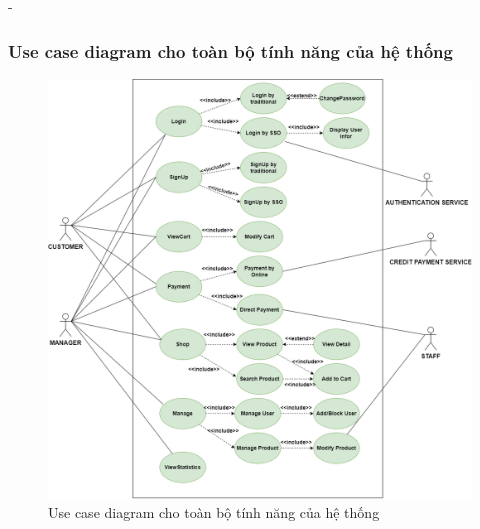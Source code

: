 \begin {list} {-}{}
\subsubsection{Use case diagram cho toàn bộ tính năng của hệ thống}
\begin{figure}[H]
    \begin{center}
    \includegraphics[scale=0.45]{images/hieu/chap-3/usecase-diagram.png}
    \vspace*{5mm}
    \caption{Use case diagram cho toàn bộ tính năng của hệ thống}
    \end{center}
\end{figure}
\newpage

\end{list}
